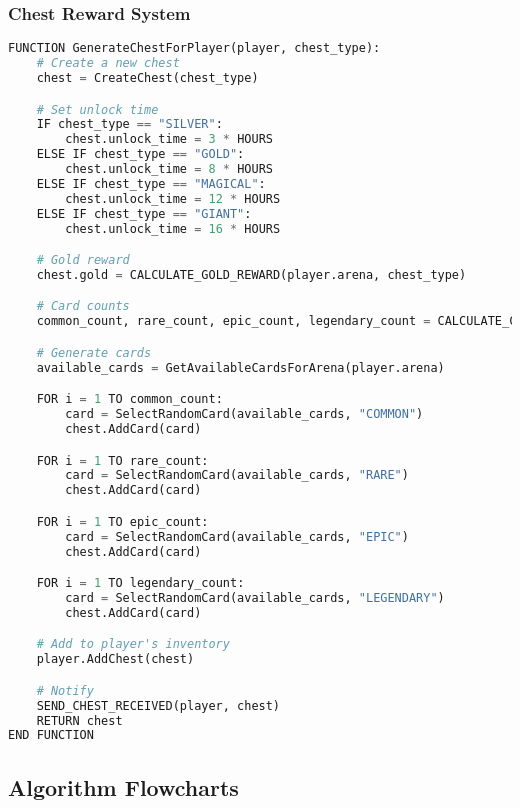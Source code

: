 \documentclass{article}
\begin{document}
\subsubsection{Chest Reward System}
\begin{lstlisting}[language=Python, caption=Chest Generation]
FUNCTION GenerateChestForPlayer(player, chest_type):
    # Create a new chest
    chest = CreateChest(chest_type)

    # Set unlock time
    IF chest_type == "SILVER":
        chest.unlock_time = 3 * HOURS
    ELSE IF chest_type == "GOLD":
        chest.unlock_time = 8 * HOURS
    ELSE IF chest_type == "MAGICAL":
        chest.unlock_time = 12 * HOURS
    ELSE IF chest_type == "GIANT":
        chest.unlock_time = 16 * HOURS

    # Gold reward
    chest.gold = CALCULATE_GOLD_REWARD(player.arena, chest_type)

    # Card counts
    common_count, rare_count, epic_count, legendary_count = CALCULATE_CARD_COUNTS(player.arena, chest_type)

    # Generate cards
    available_cards = GetAvailableCardsForArena(player.arena)

    FOR i = 1 TO common_count:
        card = SelectRandomCard(available_cards, "COMMON")
        chest.AddCard(card)

    FOR i = 1 TO rare_count:
        card = SelectRandomCard(available_cards, "RARE")
        chest.AddCard(card)

    FOR i = 1 TO epic_count:
        card = SelectRandomCard(available_cards, "EPIC")
        chest.AddCard(card)

    FOR i = 1 TO legendary_count:
        card = SelectRandomCard(available_cards, "LEGENDARY")
        chest.AddCard(card)

    # Add to player's inventory
    player.AddChest(chest)

    # Notify
    SEND_CHEST_RECEIVED(player, chest)
    RETURN chest
END FUNCTION
\end{lstlisting}

\FloatBarrier

\subsection{Algorithm Flowcharts}
\end{document}
